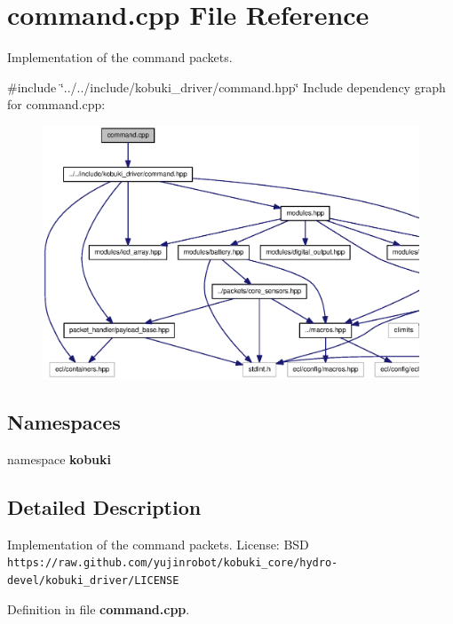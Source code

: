 \section{command.\-cpp \-File \-Reference}
\label{command_8cpp}


\-Implementation of the command packets.  


{\ttfamily \#include \char`\"{}../../include/kobuki\-\_\-driver/command.\-hpp\char`\"{}}\*
\-Include dependency graph for command.\-cpp\-:
\nopagebreak
\begin{figure}[H]
\begin{center}
\leavevmode
\includegraphics[width=350pt]{command_8cpp__incl}
\end{center}
\end{figure}
\subsection*{\-Namespaces}
\begin{DoxyCompactItemize}
\item 
namespace {\bf kobuki}
\end{DoxyCompactItemize}


\subsection{\-Detailed \-Description}
\-Implementation of the command packets. \-License\-: \-B\-S\-D {\tt https\-://raw.\-github.\-com/yujinrobot/kobuki\-\_\-core/hydro-\/devel/kobuki\-\_\-driver/\-L\-I\-C\-E\-N\-S\-E} 

\-Definition in file {\bf command.\-cpp}.

